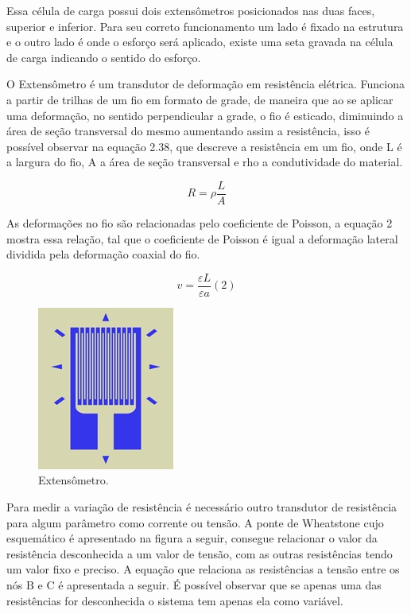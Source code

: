 Essa célula de carga possui dois extensômetros posicionados nas duas faces, superior e inferior. Para seu correto funcionamento um lado é fixado na estrutura e o outro lado é onde o esforço será aplicado, existe uma seta gravada na célula de carga indicando o sentido do esforço. 

O Extensômetro é um transdutor de deformação em resistência elétrica. Funciona a partir de trilhas de um fio em formato de grade, de maneira que ao se aplicar uma deformação, no sentido perpendicular a grade, o fio é esticado, diminuindo a área de seção transversal do mesmo aumentando assim a resistência, isso é possível observar na equação 2.38, que descreve a resistência em um fio, onde L é a largura do fio, A a área de seção transversal e rho a condutividade do material. \cite{extensometria}

\begin{equation}
    R = \rho \frac{L}{A}
\end{equation}

As deformações no fio são relacionadas pelo coeficiente de Poisson, a equação 2 mostra essa relação, tal que o coeficiente de Poisson é igual a deformação lateral dividida pela deformação coaxial do fio. \cite{extensometria}

\begin{equation}
    v = \frac{\varepsilon L}{\varepsilon a} (2)
\end{equation}

\begin{figure}[!ht]
	\centering
		\includegraphics[scale=0.5]{figuras/eletronica/13-Extensometro.jpg}
	\caption{Extensômetro.}
\end{figure}

Para medir a variação de resistência é necessário outro transdutor de resistência para algum parâmetro como corrente ou tensão. A ponte de Wheatstone cujo esquemático é apresentado na figura a seguir, consegue relacionar o valor da resistência desconhecida a um valor de tensão, com as outras resistências tendo um valor fixo e preciso. A equação que relaciona as resistências a tensão entre os nós B e C é apresentada a seguir. É possível observar que se apenas uma das resistências for desconhecida o sistema tem apenas ela como variável. \cite{ponteWheatstone}

